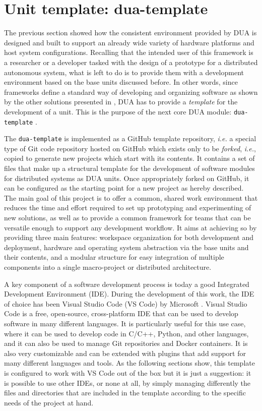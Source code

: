 \section{Unit template: dua-template}
\label{sec:dua_template}
The previous section showed how the consistent environment provided by DUA is designed and built to support an already wide variety of hardware platforms and host system configurations. Recalling that the intended user of this framework is a researcher or a developer tasked with the design of a prototype for a distributed autonomous system, what is left to do is to provide them with a development environment based on the base units discussed before. In other words, since frameworks define a standard way of developing and organizing software as shown by the other solutions presented in , DUA has to provide a \emph{template} for the development of a unit. This is the purpose of the next core DUA module: \texttt{dua-template} \cite{masocco_dua-template_nodate}.

The \texttt{dua-template} is implemented as a GitHub template repository, \emph{i.e.} a special type of Git code repository hosted on GitHub \cite{github_inc_github_nodate} which exists only to be \emph{forked}, \emph{i.e.}, copied to generate new projects which start with its contents. It contains a set of files that make up a structural template for the development of software modules for distributed systems as DUA units. Once appropriately forked on GitHub, it can be configured as the starting point for a new project as hereby described. The main goal of this project is to offer a common, shared work environment that reduces the time and effort required to set up prototyping and experimenting of new solutions, as well as to provide a common framework for teams that can be versatile enough to support any development workflow. It aims at achieving so by providing three main features: workspace organization for both development and deployment, hardware and operating system abstraction via the base units and their contents, and a modular structure for easy integration of multiple components into a single macro-project or distributed architecture.

A key component of a software development process is today a good Integrated Development Environment (IDE). During the development of this work, the IDE of choice has been Visual Studio Code (VS Code) by Microsoft \cite{microsoft_visual_nodate}. Visual Studio Code is a free, open-source, cross-platform IDE that can be used to develop software in many different languages. It is particularly useful for this use case, where it can be used to develop code in C/C++, Python, and other languages, and it can also be used to manage Git repositories and Docker containers. It is also very customizable and can be extended with plugins that add support for many different languages and tools. As the following sections show, this template is configured to work with VS Code out of the box but it is just a suggestion: it is possible to use other IDEs, or none at all, by simply managing differently the files and directories that are included in the template according to the specific needs of the project at hand.

